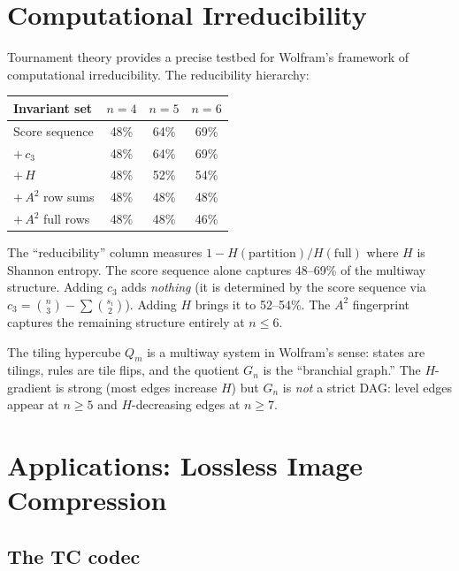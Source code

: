 \documentclass[11pt,a4paper]{article}
\theoremstyle{definition}
\theoremstyle{remark}
\begin{document}
\section{Computational Irreducibility}
\label{sec:irreducibility}

Tournament theory provides a precise testbed for Wolfram's framework of computational irreducibility. The reducibility hierarchy:

\begin{center}
\begin{tabular}{l c c c}
\toprule
Invariant set & $n=4$ & $n=5$ & $n=6$ \\
\midrule
Score sequence & 48\% & 64\% & 69\% \\
$+\, c_3$ & 48\% & 64\% & 69\% \\
$+\, H$ & 48\% & 52\% & 54\% \\
$+\, A^2$ row sums & 48\% & 48\% & 48\% \\
$+\, A^2$ full rows & 48\% & 48\% & 46\% \\
\bottomrule
\end{tabular}
\end{center}

\noindent The ``reducibility'' column measures $1 - H(\text{partition}) / H(\text{full})$ where $H$ is Shannon entropy. The score sequence alone captures 48--69\% of the multiway structure. Adding $c_3$ adds \emph{nothing} (it is determined by the score sequence via $c_3 = \binom{n}{3} - \sum \binom{s_i}{2}$). Adding $H$ brings it to 52--54\%. The $A^2$ fingerprint captures the remaining structure entirely at $n \leq 6$.

The tiling hypercube $Q_m$ is a multiway system in Wolfram's sense: states are tilings, rules are tile flips, and the quotient $G_n$ is the ``branchial graph.'' The $H$-gradient is strong (most edges increase $H$) but $G_n$ is \emph{not} a strict DAG: level edges appear at $n \geq 5$ and $H$-decreasing edges at $n \geq 7$.

\section{Applications: Lossless Image Compression}
\label{sec:compression}

\subsection{The TC codec}
\end{document}
